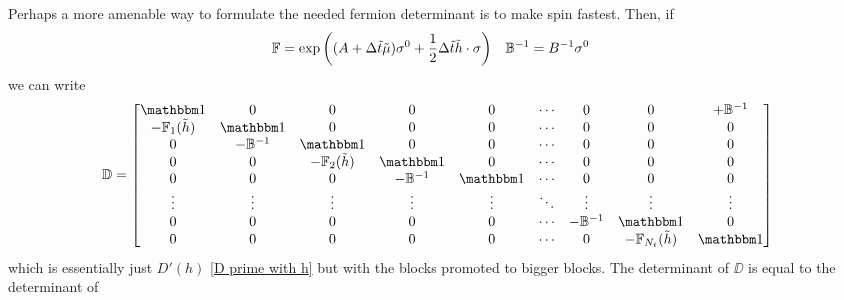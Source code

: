 Perhaps a more amenable way to formulate the needed fermion determinant is to make spin fastest.
Then, if
\begin{align}
	\mathbb{F} &= \exp\left( (A+\Delta\tilde{t}\tilde{\mu})\sigma^0 + \frac{1}{2} \Delta\tilde{t}\tilde{h}\cdot \sigma\right)
	&
	\mathbb{B}^{-1} &= B^{-1} \sigma^0
\end{align}
we can write
\begin{align}
	\DD = \begin{bmatrix} 
			\one            & 0         & 0                 & 0         & 0      & \cdots & 0       & 0                     & +\BB^{-1}
		\\	-\FF_1(\tilde{h}) & \one      & 0                 & 0         & 0      & \cdots & 0       & 0                     & 0
		\\	0               & -\BB^{-1}   & \one              & 0         & 0      & \cdots & 0       & 0                     & 0
		\\	0               & 0         & -\FF_2(\tilde{h})   & \one      & 0      & \cdots & 0       & 0                     & 0
		\\	0               & 0         & 0                 & -\BB^{-1}   & \one   & \cdots & 0       & 0                     & 0
		\\	\vdots          & \vdots    & \vdots            & \vdots    & \vdots & \ddots & \vdots  & \vdots                & \vdots
		\\	0               & 0         & 0                 & 0         & 0      & \cdots & -\BB^{-1} & \one                  & 0
		\\	0               & 0         & 0                 & 0         & 0      & \cdots & 0       & -\FF_{N_t}(\tilde{h})   & \one
	\end{bmatrix}
\end{align}
which is essentially just $D'(h)$ \eqref{D prime with h} but with the blocks promoted to bigger blocks.
The determinant of $\DD$ is equal to the determinant of
